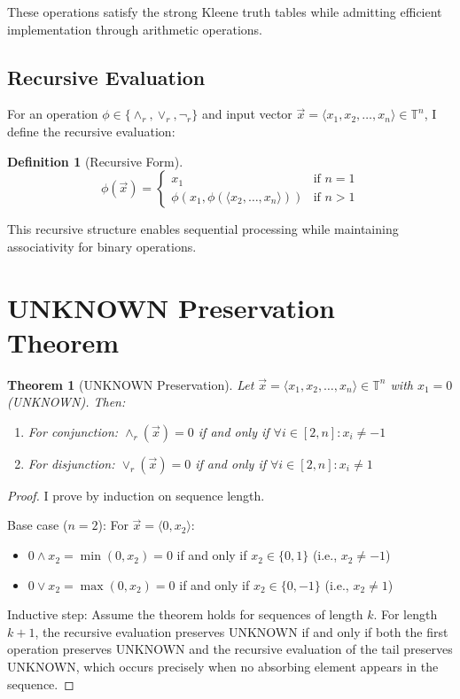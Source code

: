 \documentclass[11pt,a4paper]{article}
\newtheorem{theorem}{Theorem}
\newtheorem{definition}{Definition}
\begin{document}
These operations satisfy the strong Kleene truth tables while admitting efficient implementation through arithmetic operations.

\subsection{Recursive Evaluation}

For an operation $\phi \in \{\land_r, \lor_r, \neg_r\}$ and input vector $\vec{x} = \langle x_1, x_2, \ldots, x_n \rangle \in \mathbb{T}^n$, I define the recursive evaluation:

\begin{definition}[Recursive Form]
\begin{equation}
\phi(\vec{x}) = \begin{cases}
x_1 & \text{if } n = 1 \\
\phi(x_1, \phi(\langle x_2, \ldots, x_n \rangle)) & \text{if } n > 1
\end{cases}
\end{equation}
\end{definition}

This recursive structure enables sequential processing while maintaining associativity for binary operations.

\section{UNKNOWN Preservation Theorem}

\begin{theorem}[UNKNOWN Preservation]
Let $\vec{x} = \langle x_1, x_2, \ldots, x_n \rangle \in \mathbb{T}^n$ with $x_1 = 0$ (UNKNOWN). Then:
\begin{enumerate}
\item For conjunction: $\land_r(\vec{x}) = 0$ if and only if $\forall i \in [2,n]: x_i \neq -1$
\item For disjunction: $\lor_r(\vec{x}) = 0$ if and only if $\forall i \in [2,n]: x_i \neq 1$
\end{enumerate}
\end{theorem}

\begin{proof}
I prove by induction on sequence length.

Base case ($n=2$): For $\vec{x} = \langle 0, x_2 \rangle$:
\begin{itemize}
\item $0 \land x_2 = \min(0, x_2) = 0$ if and only if $x_2 \in \{0, 1\}$ (i.e., $x_2 \neq -1$)
\item $0 \lor x_2 = \max(0, x_2) = 0$ if and only if $x_2 \in \{0, -1\}$ (i.e., $x_2 \neq 1$)
\end{itemize}

Inductive step: Assume the theorem holds for sequences of length $k$. For length $k+1$, the recursive evaluation preserves UNKNOWN if and only if both the first operation preserves UNKNOWN and the recursive evaluation of the tail preserves UNKNOWN, which occurs precisely when no absorbing element appears in the sequence.
\end{proof}
\end{document}
